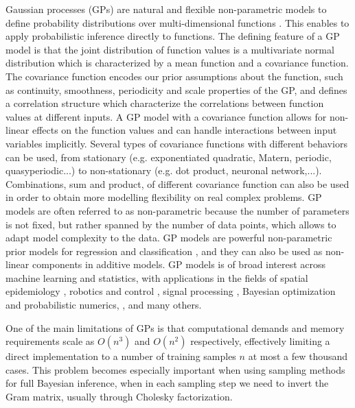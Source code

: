 \documentclass[]{interact}
\theoremstyle{plain}%
\theoremstyle{definition}
\theoremstyle{remark}
\begin{document}
Gaussian processes (GPs) are natural and flexible non-parametric models to define probability distributions over multi-dimensional functions \citep{rasmussen2006gaussian,neal1997monte}. This enables to apply probabilistic inference directly to functions. The defining feature of a GP model is that the joint distribution of function values is a multivariate normal distribution which is characterized by a mean function and a covariance function. The covariance function encodes our prior assumptions about the function, such as continuity, smoothness, periodicity and scale properties of the GP, and defines a correlation structure which characterize the correlations between function values at different inputs. A GP model with a covariance function allows for non-linear effects on the function values and can handle interactions between input variables implicitly. Several types of covariance functions with different behaviors can be used, from stationary (e.g. exponentiated quadratic, Matern, periodic, quasyperiodic...) to non-stationary (e.g. dot product, neuronal network,...). Combinations, sum and product, of different covariance function can also be used in order to obtain more modelling flexibility on real complex problems. GP models are often referred to as non-parametric because the number  of parameters is not fixed, but rather spanned by the number of data points, which allows to adapt model complexity to the data. GP models are powerful non-parametric prior models for regression and classification \citep{rasmussen2006gaussian}, and they can also be used as non-linear components in additive models. GP models is of broad interest across machine learning and statistics, with applications in the fields of spatial epidemiology \citep{diggle2013statistical,carlin2014hierarchical}, robotics and control \citep{deisenroth2015gaussian}, signal processing \citep{sarkka2013spatiotemporal}, Bayesian optimization and probabilistic numerics, \citep{roberts2010bayesian,briol2015probabilistic,hennig2015probabilistic}, and many others.

One of the main limitations of GPs is that computational demands and memory requirements scale as $O(n^3)$ and $O(n^2)$ respectively, effectively limiting a direct implementation to a number of training samples $n$ at most a few thousand cases.   This problem becomes especially important when using sampling methods for full Bayesian inference, when in each sampling step we need to invert the Gram matrix, usually through Cholesky factorization. 
\end{document}
